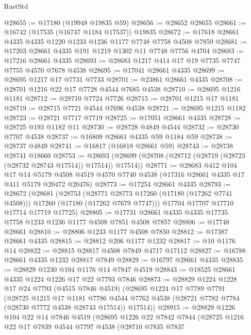 \begin{lexlean}{RustStd}
\begin{coremodule}
{\begin{coremodule}
{{{{{{{{{{{{{{{{{{{{{{{{{{{{{{{{{{{{{{{{{{{{{{{{{{{{{{{@28655 := @17180 (@19948 @19835 @59)
@28656 := @28652 @28655
@28661 := @16742 (@17535 (@16747 @1184 @17537)) @19835
@28672 := @17618 @28661 @4335 @4335 @1220 @1233 @1236 @1177 @7748 @7758 @4508 @7859
@28681 := @17203 @28661 @4335 @191 @1219 @1302 @11 @7748 @7756 @4704
@28683 := @17216 @28661 @4335
@28693 := @28683 @1217 @414 @17 @19 @7735 @7747 @7755 @4570 @7678 @4538
@28695 := @17041 @28661 @4335
@28699 := @28695 @1217 @17 @7731 @7733
@28701 := @23861 @28661 @4335
@28708 := @28701 @1216 @22 @17 @7728 @4544 @7685 @4538
@28710 := @28695 @1216 @1181
@28712 := @28710 @7724 @7726
@28715 := @28701 @1215 @17 @1181
@28719 := @28715 @7721 @4544 @7696 @4538
@28721 := @28695 @1215 @1182
@28723 := @28721 @7717 @7719
@28725 := @17051 @28661 @4335
@28728 := @28725 @193 @1182 @11
@28730 := @28728 @4849 @4544
@28732 := @28730 @7707 @4538
@28737 := @16809 @28661 @4335 @59 @1184 @59
@28738 := @28737 @4849
@28741 := @16817 (@16818 @28661 @59)
@28743 := @28738 @28741 @18660
@28753 := @28693 (@28699 (@28708 (@28712 (@28719 (@28723 (@28732 @28743 @17514)) @17514)) @17514))
@28771 := @28683
    @412
    @104
    @17
    @14
    @5179
    @4508
    @4519
    @4570
    @7740
    @4538
    (@17316 @28661 @4335 @17 @411 @5179 @20472 @20476)
@28773 := @17254 @28661 @4335
@28793 := @28672
    (@28681
      (@28753
        (@28771 @28773 @17260 (@17180 (@17262 @7741 @4508)))
        @17260
        (@17180 (@17262 @7679 @7747)))
      @17704
      @17707
      @17710
      @17714
      @17719
      @17725)
@28805 := @17731 @28661 @4335 @4335 @17735 @7758 @1233 @1236 @1177 @4508 @7851 @4508 @7857
@28806 := @17748 @28661
@28810 := @28806 @1233 @1177 @4508 @7850
@28812 := @17387 @28661 @4335
@28815 := @28812 @206 @1177 @1232
@28817 := @10 @1176 @14
@28822 := @28815 @28817 @4508 @7849 @4717 @17112
@28827 := @16788 @28661 @4335 @1232 @28817 @7849
@28829 := @16797 @28661 @4335
@28835 := @28829 @1230 @104 @1176 @14 @7847 @4519
@28843 := @18525 @28661 @4335 @1224 @1226 @17 @22 @7793 @7846
@28873 := @28829
    @1224
    @1228
    @17
    @24
    @7793
    (@4515 @7846 @4519)
    (@28695
      @1224
      @17
      @7789
      @7791
      (@28725
        @1215
        @17
        @1181
        @7786
        @4544
        @7762
        @4538
        (@28721 @7782 @7784 (@28730 @7772 @4538 @28743 @17514))
        @17514))
@28915 := @28829
    @1226
    @104
    @22
    @14
    @7846
    @4519
    (@28695
      @1226
      @22
      @7842
      @7844
      (@28725
        @1216
        @22
        @17
        @7839
        @4544
        @7797
        @4538
        (@28710
          @7835
          @7837
}}}}}}}}}}}}}}}}}}}}}}}}}}}}}}}}}}}}}}}}}}}}}}}}}}}}}}}
\end{coremodule}}
\end{coremodule}
\end{lexlean}
